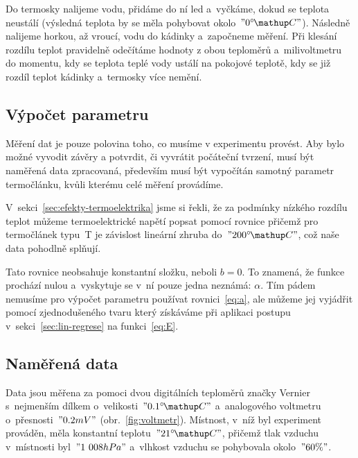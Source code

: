 Do termosky nalijeme vodu, přidáme do ní led a~vyčkáme, dokud se teplota
neustálí (výsledná teplota by se měla pohybovat okolo~$"0 \C"$). Následně
nalijeme horkou, až vroucí, vodu do kádinky a~započneme měření. Při klesání
rozdílu teplot pravidelně odečítáme hodnoty z obou teploměrů a~milivoltmetru
do momentu, kdy se teplota teplé vody ustálí na pokojové teplotě, kdy se
již rozdíl teplot kádinky a~termosky více nemění.


\subsection{Výpočet parametru}
Měření dat je pouze polovina toho, co musíme v experimentu provést. Aby bylo
možné vyvodit závěry a potvrdit, či vyvrátit počáteční tvrzení, musí být
naměřená data zpracovaná,
především musí být vypočítán samotný parametr termočlánku, kvůli kterému
celé měření provádíme.

V~sekci~\ref{sec:efekty-termoelektrika} jsme si řekli, že za podmínky nízkého
rozdílu teplot můžeme termoelektrické napětí popsat pomocí rovnice
přičemž pro termočlánek typu~T je závislost lineární zhruba do~$"200 \C"$, což
naše data pohodlně splňují.~\cite{thermocoupleinfo}

Tato rovnice neobsahuje konstantní složku, neboli $b=0$. To znamená, že funkce
prochází nulou a~vyskytuje se v~ní pouze jedna neznámá: $\alpha$. Tím pádem
nemusíme pro výpočet parametru používat rovnici~\eqref{eq:a}, ale můžeme jej
vyjádřit pomocí zjednodušeného tvaru
který získáváme při aplikaci postupu v~sekci~\ref{sec:lin-regrese} na 
funkci~\eqref{eq:E}. 


\subsection{Naměřená data}
Data jsou měřena za pomoci dvou digitálních teploměrů značky Vernier
s~nejmenším dílkem o~velikosti~$"0.1 \C"$ a~analogového voltmetru
o~přesnosti~$"0.2 mV"$ (obr.~\ref{fig:voltmetr}).
Místnost, v~níž byl experiment prováděn, měla konstantní teplotu~$"21 \C"$,
přičemž tlak vzduchu v~místnosti byl~$"1~008 hPa"$ a~vlhkost vzduchu se
pohybovala okolo~$"60 \%"$.


